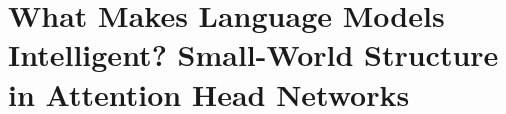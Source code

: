 \chapter{What Makes Language Models Intelligent? Small-World Structure in Attention Head Networks}
\label{chapter:swa}







